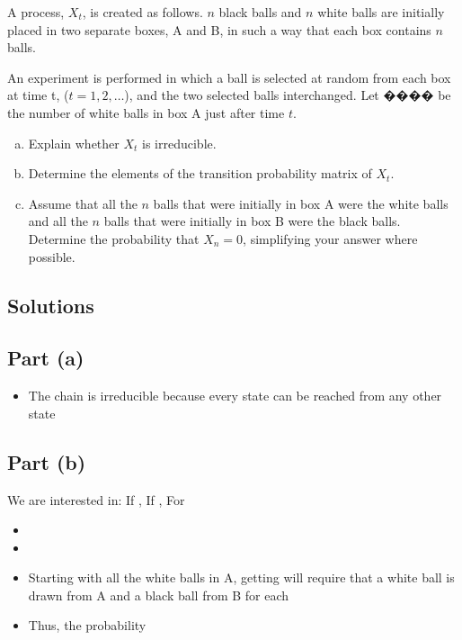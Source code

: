 \documentclass[a4paper,12pt]{article}
\begin{document}


\large 
\noindent A process, $X_{t}$, is created as follows. $n$ black balls and $n$ white balls are initially placed in two separate boxes, A and B, in such a way that each box contains $n$ balls. 

An
experiment is performed in which a ball is selected at random from each box at time t,
($t = 1, 2, \ldots$), and the two selected balls interchanged. Let ���� be the number of white
balls in box A just after time $t$.

\begin{enumerate}[(a)]
\item   Explain whether $X_{t}$ is irreducible. 
\item   Determine the elements of the transition probability matrix of $X_{t}$. 
\item Assume that all the $n$ balls that were initially in box A were the white balls and all the
$n$ balls that were initially in box B were the black balls.
 Determine the probability that $X_{n} = 0$, simplifying your answer where possible.
\end{enumerate}

\subsection*{Solutions}

\subsection*{Part (a)}
\begin{itemize}
\item  
The chain is irreducible because every state can be reached from any other state 
\end{itemize}


\subsection*{Part (b)}
\item  
We are interested in:
If , 
If , 
For

\begin{itemize}
\item
\item
\end{itemize}





\begin{itemize}
\item Starting with all the white balls in A, getting will require that a white ball is
drawn from A and a black ball from B for each 
\item Thus, the probability

\end{itemize}
\end{document}
